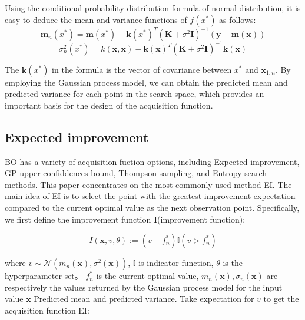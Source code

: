 \documentclass{article}
\begin{document}
\hspace*{\fill}

Using the conditional probability distribution formula of normal distribution, it is easy to deduce the mean and variance functions of $f(x^*)$ as follows:
\begin{equation}\label{eq4}
\textbf{m}_n(x^*)=\textbf{m}(x^*)+\textbf{k}(x^*)^T(\textbf{K}+\sigma^2\textbf{I})^{-1}(\textbf{y}-\textbf{m}(\textbf{x}))
\end{equation}
\begin{equation}\label{eq5}
\sigma^2_n(x^*)=k(\textbf{x},\textbf{x})-\textbf{k}(\textbf{x})^T(\textbf{K}+\sigma^2\textbf{I})^{-1} \textbf{k}(\textbf{x})
\end{equation}

The $\textbf{k}(x^*)$ in the formula is the vector of covariance between $x^*$ and $\textbf{x}_{1:n}$.
By employing the Gaussian process model, we can obtain the predicted mean and predicted variance for each point in the search space, which provides an important basis for the design of the acquisition function.

\subsection{Expected improvement}
\hspace{2em}BO has a variety of acquisition fuction options, including Expected improvement\citep{Jones1998Efficient}, GP upper confiddences bound\citep{Srinivas2009Gaussian}, Thompson sampling\citep{Thompson1933On}, and Entropy search methods\citep{Hennig2012Entropy}. This paper concentrates on the most commonly used method EI. The main idea of EI is to select the point with the greatest improvement expectation compared to the current optimal value as the next observation point. Specifically, we first define the improvement function $\textbf{I}$(improvement function):

\begin{equation}\label{eq6}
	\textit{I}(\textbf{x},v,\theta):=(v-f^*_n)\mathbb{I}(v>f^*_n)
\end{equation}

where $v\sim \mathcal{N}(m_n(\textbf{x}),\sigma^2(\textbf{x}))$, $\mathbb{I}$ is indicator function, $\theta$ is the hyperparameter set。
$f^*_n$ is the current optimal value, $m_n(\textbf{x}),\sigma_n(\textbf{x})$ are respectively the values returned by the Gaussian process model for the input value $\textbf{x}$ Predicted mean and predicted variance.
Take expectation for $v$ to get the acquisition function EI:
\end{document}
